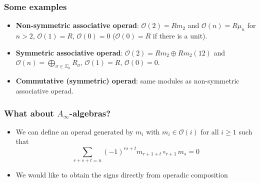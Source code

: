 \documentclass{beamer}
\theoremstyle{definition}
\begin{document}
\begin{frame}
\frametitle{Some examples}

\begin{itemize}
\item<1-> \textbf{Non-symmetric associative operad}: $\mathcal{O}(2)=R m_2$ and $\mathcal{O}(n)=R\mu_n$ for $n> 2$, $\mathcal{O}(1)=R$, $\mathcal{O}(0)=0$ ($\mathcal{O}(0)=R$ if there is a unit). %


\item<2-> \textbf{Symmetric associative operad}: $\mathcal{O}(2)=Rm_2\oplus Rm_2(12)$ and $\mathcal{O}(n)=\bigoplus_{\sigma\in\Sigma_n}R_\sigma$, $\mathcal{O}(1)=R$, $\mathcal{O}(0)=0$. 
\item<3-> \textbf{Commutative (symmetric) operad}: same modules as non-symmetric associative operad. %

\end{itemize}
\end{frame}


\begin{frame}
\frametitle{What about $A_\infty$-algebras?}
\begin{itemize}
\item<1-> We can define an operad generated by $m_i$ with $m_i\in\mathcal{O}(i)$ for all $i\geq 1$ such that 
$$\sum_{r+s+t=n}(-1)^{rs+t}m_{r+1+t}\circ_{r+1}m_s=0$$ 

\item<2-> We would like to obtain the signs directly from operadic composition
\end{itemize}
\end{frame}
\end{document}
